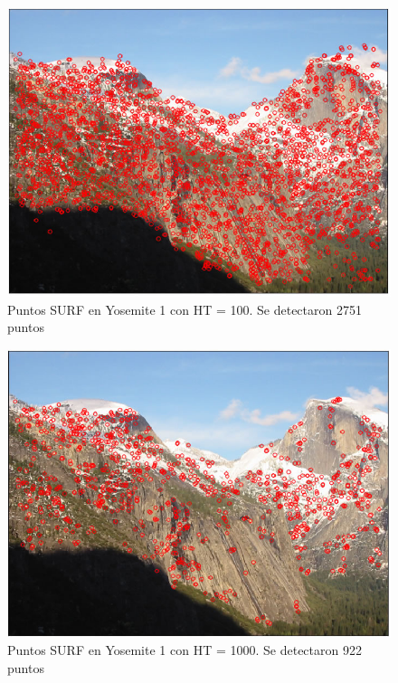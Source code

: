\documentclass[12pt,spanish]{article} %
\begin{document}
\begin{figure}[H]
  \begin{center}
  \includegraphics[scale=.6]{ej1_surf1_ht100}
  \caption{Puntos SURF en Yosemite 1 con HT = 100. Se detectaron 2751 puntos}
  \label{fig:ej1_surf1_ht100}
  \end{center}
\end{figure}

\begin{figure}[H]
  \begin{center}
  \includegraphics[scale=.6]{ej1_surf1_ht1000}
  \caption{Puntos SURF en Yosemite 1 con HT = 1000. Se detectaron 922 puntos}
  \label{fig:ej1_surf1_ht1000}
  \end{center}
\end{figure}
\end{document}
